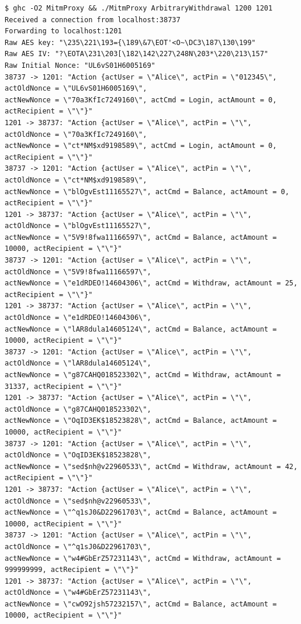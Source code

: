 \documentclass[12pt]{article}
\begin{document}
\begin{Verbatim}[frame=single,fontsize=\scriptsize]
$ ghc -O2 MitmProxy && ./MitmProxy ArbitraryWithdrawal 1200 1201
Received a connection from localhost:38737
Forwarding to localhost:1201
Raw AES key: "\235\221\193={\189\&7\EOT'<O~\DC3\187\130\199"
Raw AES IV: "?\EOTA\231\203[\182\142\227\248N\203*\220\213\157"
Raw Initial Nonce: "UL6vS01H6005169"
38737 -> 1201: "Action {actUser = \"Alice\", actPin = \"012345\", actOldNonce = \"UL6vS01H6005169\", 
actNewNonce = \"70a3KfIc7249160\", actCmd = Login, actAmount = 0, actRecipient = \"\"}"
1201 -> 38737: "Action {actUser = \"Alice\", actPin = \"\", actOldNonce = \"70a3KfIc7249160\", 
actNewNonce = \"ct*NM$xd9198589\", actCmd = Login, actAmount = 0, actRecipient = \"\"}"
38737 -> 1201: "Action {actUser = \"Alice\", actPin = \"\", actOldNonce = \"ct*NM$xd9198589\", 
actNewNonce = \"blOgvEst11165527\", actCmd = Balance, actAmount = 0, actRecipient = \"\"}"
1201 -> 38737: "Action {actUser = \"Alice\", actPin = \"\", actOldNonce = \"blOgvEst11165527\", 
actNewNonce = \"5V9!8fwa11166597\", actCmd = Balance, actAmount = 10000, actRecipient = \"\"}"
38737 -> 1201: "Action {actUser = \"Alice\", actPin = \"\", actOldNonce = \"5V9!8fwa11166597\", 
actNewNonce = \"e1dRDEO!14604306\", actCmd = Withdraw, actAmount = 25, actRecipient = \"\"}"
1201 -> 38737: "Action {actUser = \"Alice\", actPin = \"\", actOldNonce = \"e1dRDEO!14604306\", 
actNewNonce = \"lAR8dula14605124\", actCmd = Balance, actAmount = 10000, actRecipient = \"\"}"
38737 -> 1201: "Action {actUser = \"Alice\", actPin = \"\", actOldNonce = \"lAR8dula14605124\", 
actNewNonce = \"g87CAHQ018523302\", actCmd = Withdraw, actAmount = 31337, actRecipient = \"\"}"
1201 -> 38737: "Action {actUser = \"Alice\", actPin = \"\", actOldNonce = \"g87CAHQ018523302\", 
actNewNonce = \"OqID3EK$18523828\", actCmd = Balance, actAmount = 10000, actRecipient = \"\"}"
38737 -> 1201: "Action {actUser = \"Alice\", actPin = \"\", actOldNonce = \"OqID3EK$18523828\", 
actNewNonce = \"sed$nh@v22960533\", actCmd = Withdraw, actAmount = 42, actRecipient = \"\"}"
1201 -> 38737: "Action {actUser = \"Alice\", actPin = \"\", actOldNonce = \"sed$nh@v22960533\", 
actNewNonce = \"^q1sJ0&D22961703\", actCmd = Balance, actAmount = 10000, actRecipient = \"\"}"
38737 -> 1201: "Action {actUser = \"Alice\", actPin = \"\", actOldNonce = \"^q1sJ0&D22961703\", 
actNewNonce = \"w4#GbErZ57231143\", actCmd = Withdraw, actAmount = 999999999, actRecipient = \"\"}"
1201 -> 38737: "Action {actUser = \"Alice\", actPin = \"\", actOldNonce = \"w4#GbErZ57231143\", 
actNewNonce = \"cwO92jsh57232157\", actCmd = Balance, actAmount = 10000, actRecipient = \"\"}"

\end{Verbatim}
\end{document}
